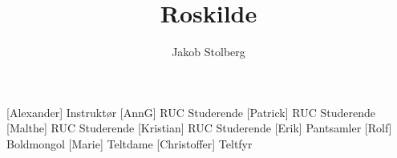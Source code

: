 \documentclass[a4paper,11pt]{article}
\title{Roskilde}
\author{Jakob Stolberg}
\begin{document}
\maketitle

\begin{roles}
[Alexander] Instruktør
[AnnG] RUC Studerende
[Patrick] RUC Studerende
[Malthe] RUC Studerende
[Kristian] RUC Studerende
[Erik] Pantsamler
[Rolf] Boldmongol
[Marie] Teltdame
[Christoffer] Teltfyr
\end{roles}


  
\end{document}
